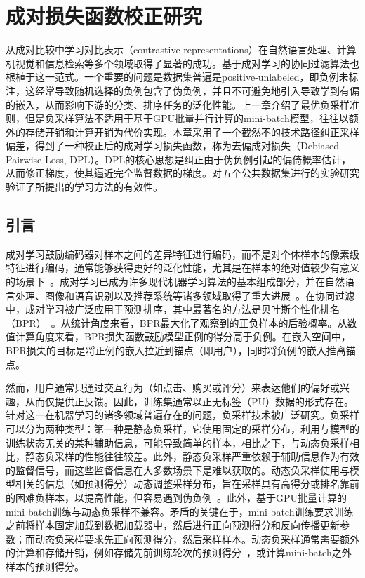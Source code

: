 \chapter{成对损失函数校正研究}
\label{cha:fourthsection}
从成对比较中学习对比表示（contrastive representations）在自然语言处理、计算机视觉和信息检索等多个领域取得了显著的成功。基于成对学习的协同过滤算法也根植于这一范式。一个重要的问题是数据集普遍是positive-unlabeled，即负例未标注，这经常导致随机选择的负例包含了伪负例，并且不可避免地引入导致学到有偏的嵌入，从而影响下游的分类、排序任务的泛化性能。上一章介绍了最优负采样准则，但是负采样算法不适用于基于GPU批量并行计算的mini-batch模型，往往以额外的存储开销和计算开销为代价实现。本章采用了一个截然不的技术路径纠正采样偏差，得到了一种校正后的成对学习损失函数，称为去偏成对损失（Debiased Pairwise Loss, DPL）。DPL的核心思想是纠正由于伪负例引起的偏倚概率估计，从而修正梯度，使其逼近完全监督数据的梯度。对五个公共数据集进行的实验研究验证了所提出的学习方法的有效性。

\section{引言}
成对学习鼓励编码器对样本之间的差异特征进行编码，而不是对个体样本的像素级特征进行编码，通常能够获得更好的泛化性能，尤其是在样本的绝对值较少有意义的场景下~\cite{Wang:2020:ICML,McFadden:1974:FE,gutmann:2012:JMLR,Liu:2021:TKDE,Wang:2020:ICML}。成对学习已成为许多现代机器学习算法的基本组成部分，并在自然语言处理、图像和语音识别以及推荐系统等诸多领域取得了重大进展~\cite{Oord:2018:arxiv,Wang:2020:ICML,He:2020:CVPR,Steffen:2009:UAI}。在协同过滤中，成对学习被广泛应用于预测排序，其中最著名的方法是贝叶斯个性化排名（BPR）~\cite{Steffen:2009:UAI}。从统计角度来看，BPR最大化了观察到的正负样本的后验概率。从数值计算角度来看，BPR损失函数鼓励模型正例的得分高于负例。在嵌入空间中，BPR损失的目标是将正例的嵌入拉近到锚点（即用户），同时将负例的嵌入推离锚点。

然而，用户通常只通过交互行为（如点击、购买或评分）来表达他们的偏好或兴趣，从而仅提供正反馈。因此，训练集通常以正无标签（PU）数据的形式存在。针对这一在机器学习的诸多领域普遍存在的问题，负采样技术被广泛研究。负采样可以分为两种类型：第一种是静态负采样，它使用固定的采样分布，利用与模型的训练状态无关的某种辅助信息，可能导致简单的样本，相比之下，与动态负采样相比，静态负采样的性能往往较差。此外，静态负采样严重依赖于辅助信息作为有效的监督信号，而这些监督信息在大多数场景下是难以获取的。动态负采样使用与模型相关的信息（如预测得分）动态调整采样分布，旨在采样具有高得分或排名靠前的困难负样本，以提高性能，但容易遇到伪负例~\cite{Ding:2020:NIPS}。此外，基于GPU批量计算的mini-batch训练与动态负采样不兼容。矛盾的关键在于，mini-batch训练要求训练之前将样本固定加载到数据加载器中，然后进行正向预测得分和反向传播更新参数；而动态负采样要求先正向预测得分，然后采样样本。动态负采样通常需要额外的计算和存储开销，例如存储先前训练轮次的预测得分~\cite{Ding:2020:NIPS}，或计算mini-batch之外样本的预测得分。

